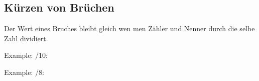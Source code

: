 \subsection{Kürzen von Brüchen}

Der Wert eines Bruches bleibt gleich wen men Zähler und Nenner durch die selbe Zahl dividiert.

\hfill \break
Example: /10:
\fboxrule=0.8pt 
    
\hfill \break   
Example: /8:
\fboxrule=0.8pt 
